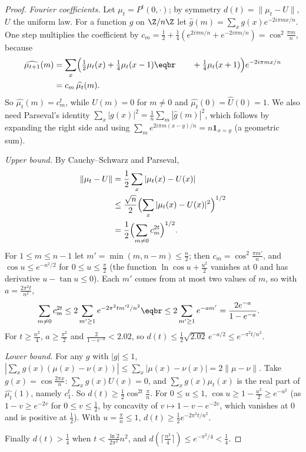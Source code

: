 \begin{proof}
\emph{Fourier coefficients.} Let $\mu_t=P^t(0,\cdot)$; by symmetry $d(t)=\|\mu_t-U\|$, $U$ the uniform law. For a function $g$ on $\Z/n\Z$ let
$\hat g(m)=\sum_xg(x)e^{-2i\pi mx/n}$. One step multiplies the coefficient by $c_m=\frac12+\frac14(e^{2i\pi m/n}+e^{-2i\pi m/n})=\cos^2\frac{\pi m}n$, because
\[
\begin{aligned}\widehat{\mu_{t+1}}(m)&=\sum_x\Bigl(\tfrac12\mu_t(x)+\tfrac14\mu_t(x-1)\eqbr\qquad+\tfrac14\mu_t(x+1)\Bigr)e^{-2i\pi mx/n}\\&=c_m\,\widehat{\mu_t}(m).\end{aligned}
\]
So $\widehat{\mu_t}(m)=c_m^t$, while $\hat U(m)=0$ for $m\ne0$ and $\widehat{\mu_t}(0)=\hat U(0)=1$. We also need Parseval's identity
$\sum_x|g(x)|^2=\frac1n\sum_m|\hat g(m)|^2$, which follows by expanding the right side and using $\sum_me^{2i\pi m(x-y)/n}=n\mathbf 1_{x=y}$ (a geometric sum).

\emph{Upper bound.} By Cauchy--Schwarz and Parseval,
\[
\begin{aligned}\|\mu_t-U\|&=\frac12\sum_x|\mu_t(x)-U(x)|\\&\le\frac{\sqrt n}2\Bigl(\sum_x|\mu_t(x)-U(x)|^2\Bigr)^{1/2}\\&=\frac12\Bigl(\sum_{m\ne0}c_m^{2t}\Bigr)^{1/2}.\end{aligned}
\]
For $1\le m\le n-1$ let $m'=\min(m,n-m)\le\frac n2$; then $c_m=\cos^2\frac{\pi m'}n$, and $\cos u\le e^{-u^2/2}$ for $0\le u\le\frac\pi2$ (the function $\ln\cos u+\frac{u^2}2$ vanishes at $0$
and has derivative $u-\tan u\le0$). Each $m'$ comes from at most two values of $m$, so with $a=\frac{2\pi^2t}{n^2}$,
\[
\begin{aligned}\sum_{m\ne0}c_m^{2t}&\le2\sum_{m'\ge1}e^{-2\pi^2tm'^2/n^2}\eqbr\le2\sum_{m'\ge1}e^{-am'}=\frac{2e^{-a}}{1-e^{-a}}.\end{aligned}
\]
For $t\ge\frac{n^2}4$, $a\ge\frac{\pi^2}2$ and $\frac2{1-e^{-a}}<2.02$, so $d(t)\le\frac12\sqrt{2.02}\,e^{-a/2}\le e^{-\pi^2t/n^2}$.

\emph{Lower bound.} For any $g$ with $|g|\le1$, $|\sum_xg(x)(\mu(x)-\nu(x))|\le\sum_x|\mu(x)-\nu(x)|=2\|\mu-\nu\|$. Take $g(x)=\cos\frac{2\pi x}n$: $\sum_xg(x)U(x)=0$, and $\sum_xg(x)\mu_t(x)$ is the
real part of $\widehat{\mu_t}(1)$, namely $c_1^t$. So $d(t)\ge\frac12\cos^{2t}\frac\pi n$. For $0\le u\le1$, $\cos u\ge1-\frac{u^2}2\ge e^{-u^2}$ (as $1-v\ge e^{-2v}$ for $0\le v\le\frac12$, by
concavity of $v\mapsto1-v-e^{-2v}$, which vanishes at $0$ and is positive at $\frac12$). With $u=\frac\pi n\le1$, $d(t)\ge\frac12e^{-2\pi^2t/n^2}$.

Finally $d(t)>\frac14$ when $t<\frac{\ln2}{2\pi^2}n^2$, and $d(\lceil\frac{n^2}4\rceil)\le e^{-\pi^2/4}<\frac14$.
\end{proof}

